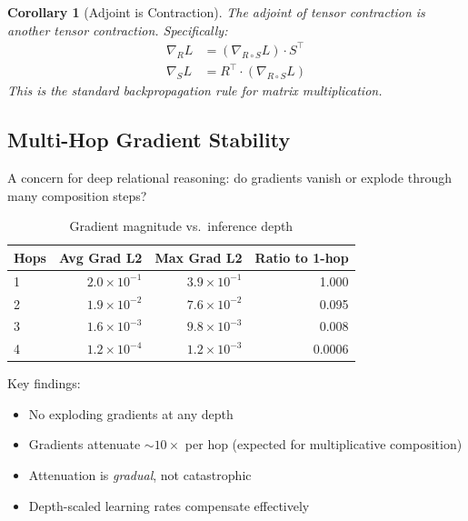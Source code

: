 \documentclass[11pt,a4paper]{article}
\newtheorem{corollary}[theorem]{Corollary}
\begin{document}
\begin{corollary}[Adjoint is Contraction]
\label{cor:adjoint_contraction_chirho}
The adjoint of tensor contraction is another tensor contraction.
Specifically:
\begin{align*}
\nabla_R L &= (\nabla_{R \circ S} L) \cdot S^\top \\
\nabla_S L &= R^\top \cdot (\nabla_{R \circ S} L)
\end{align*}
This is the standard backpropagation rule for matrix multiplication.
\end{corollary}

\subsection{Multi-Hop Gradient Stability}
\label{subsec:gradient_stability_chirho}

A concern for deep relational reasoning: do gradients vanish or explode through many composition steps?

\begin{table}[ht]
\centering
\caption{Gradient magnitude vs.\ inference depth}
\label{tab:gradient_depth_chirho}
\begin{tabular}{lrrr}
\toprule
\textbf{Hops} & \textbf{Avg Grad L2} & \textbf{Max Grad L2} & \textbf{Ratio to 1-hop} \\
\midrule
1 & $2.0 \times 10^{-1}$ & $3.9 \times 10^{-1}$ & 1.000 \\
2 & $1.9 \times 10^{-2}$ & $7.6 \times 10^{-2}$ & 0.095 \\
3 & $1.6 \times 10^{-3}$ & $9.8 \times 10^{-3}$ & 0.008 \\
4 & $1.2 \times 10^{-4}$ & $1.2 \times 10^{-3}$ & 0.0006 \\
\bottomrule
\end{tabular}
\end{table}

Key findings:
\begin{itemize}
  \item No exploding gradients at any depth
  \item Gradients attenuate $\sim 10\times$ per hop (expected for multiplicative composition)
  \item Attenuation is \emph{gradual}, not catastrophic
  \item Depth-scaled learning rates compensate effectively
\end{itemize}

\end{document}
